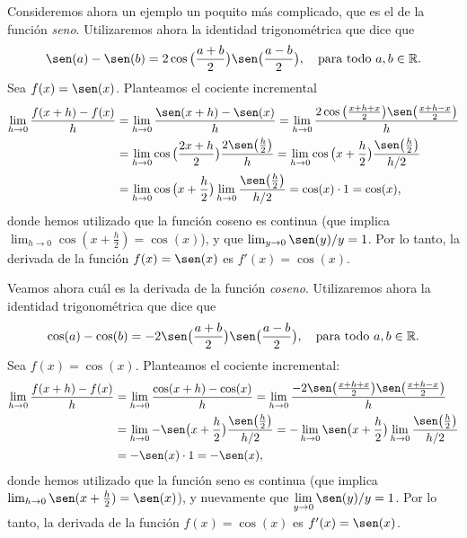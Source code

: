 \begin{example}
    Consideremos ahora un ejemplo un poquito más complicado, que es el de la función \emph{seno}.
    Utilizaremos ahora la identidad trigonométrica que dice que
    \[
    \sen(a)-\sen(b) = 2 \cos\big(\frac{a+b}2\big) \sen\big(\frac{a-b}2\big), 
    \quad\text{para todo $a,b\in\R$}.
    \]
    Sea $f(x)=\sen(x)$. Planteamos el cociente incremental 
    \begin{align*}
        \lim_{h\to0} \frac{f(x+h)-f(x)}{h} 
        &= 
        \lim_{h\to0} \frac{\sen(x+h)-\sen(x)}{h} 
        = 
        \lim_{h\to0} \frac{2\cos\big(\frac{x+h+x}2\big)\sen\big(\frac{x+h-x}2\big)}{h} 
        \\
        &= 
        \lim_{h\to0} \cos\big(\frac{2x+h}2\big)\frac{2\sen\big(\frac{h}2\big)}{h} 
        = 
        \lim_{h\to0} \cos\big(x+\frac{h}2\big)\frac{\sen\big(\frac{h}2\big)}{h/2} 
        \\
        &= 
        \lim_{h\to0} \cos\big(x+\frac{h}2\big) \lim_{h\to0}  \frac{\sen\big(\frac{h}2\big)}{h/2} 
        = \cos(x) \cdot 1 = \cos (x),
    \end{align*}
    donde hemos utilizado que la función coseno es continua (que implica $\lim_{h\to 0}\cos(x+\frac h2)=\cos(x)$), y que $\lim_{y\to0}\sen(y)/y=1$.
    Por lo tanto, la derivada de la función $f(x)=\sen(x)$ es $f'(x)=\cos(x)$.
\end{example}

\begin{example}
    Veamos ahora cuál es la derivada de la función \emph{coseno}.
    Utilizaremos ahora la identidad trigonométrica que dice que
    \[
    \cos(a)-\cos(b) = -2 \sen\big(\frac{a+b}2\big) \sen\big(\frac{a-b}2\big), 
    \quad\text{para todo $a,b\in\R$}.
    \]
    Sea $f(x)=\cos(x)$. Planteamos el cociente incremental:
    \begin{align*}
        \lim_{h\to0} \frac{f(x+h)-f(x)}{h} 
        &= 
        \lim_{h\to0} \frac{\cos(x+h)-\cos(x)}{h} 
        =
        \lim_{h\to0} \frac{-2 \sen\big(\frac{x+h+x}2\big) \sen\big(\frac{x+h-x}2\big)}h
        \\
        &= 
        \lim_{h\to0} -\sen\big(x+\frac h2\big) \frac{\sen\big(\frac h2\big)}{h/2}
        = 
        -\lim_{h\to0} \sen\big(x+\frac h2\big) \lim_{h\to0} \frac{\sen\big(\frac h2\big)}{h/2}
        \\
        &= -\sen(x) \cdot 1 = -\sen(x),
    \end{align*}
    donde hemos utilizado que la función seno es continua (que implica $\lim_{h\to 0}\sen(x+\frac h2)=\sen(x)$), y nuevamente que $\D\lim_{y\to0}\sen(y)/y=1$.
    Por lo tanto, la derivada de la función $f(x)=\cos(x)$ es $f'(x)=\sen(x)$.
\end{example}

